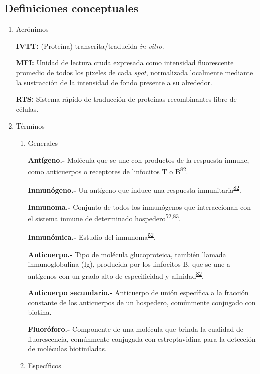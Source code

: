 \documentclass[]{article}
\begin{document}
\subsection{Definiciones conceptuales}\label{definiciones-conceptuales}

\begin{enumerate}
\def\labelenumi{\alph{enumi}.}
\item
  Acrónimos

  \textbf{IVTT:} (Proteína) transcrita/traducida \emph{in vitro}.

  \textbf{MFI:} Unidad de lectura cruda expresada como intensidad
  fluorescente promedio de todos los pixeles de cada \emph{spot},
  normalizada localmente mediante la sustracción de la intensidad de
  fondo presente a su alrededor.

  \textbf{RTS:} Sistema rápido de traducción de proteínas recombinantes
  libre de células.
\item
  Términos

  \begin{enumerate}
  \def\labelenumii{\roman{enumii}.}
  \item
    Generales

    \textbf{Antígeno.-} Molécula que se une con productos de la
    respuesta inmune, como anticuerpos o receptores de linfocitos T o
    B\textsuperscript{\protect\hyperlink{ref-abbas2012}{82}}.

    \textbf{Inmunógeno.-} Un antígeno que induce una respuesta
    inmunitaria\textsuperscript{\protect\hyperlink{ref-abbas2012}{82}}.

    \textbf{Inmunoma.-} Conjunto de todos los inmunógenos que
    interaccionan con el sistema inmune de determinado
    hospedero\textsuperscript{\protect\hyperlink{ref-immunomics2016}{52},\protect\hyperlink{ref-sette2005}{83}}.

    \textbf{Inmunómica.-} Estudio del
    inmunoma\textsuperscript{\protect\hyperlink{ref-immunomics2016}{52}}.

    \textbf{Anticuerpo.-} Tipo de molécula glucoproteica, también
    llamada inmunoglobulina (Ig), producida por los linfocitos B, que se
    une a antígenos con un grado alto de especificidad y
    afinidad\textsuperscript{\protect\hyperlink{ref-abbas2012}{82}}.

    \textbf{Anticuerpo secundario.-} Anticuerpo de unión específica a la
    fracción constante de los anticuerpos de un hospedero, comúnmente
    conjugado con biotina.

    \textbf{Fluoróforo.-} Componente de una molécula que brinda la
    cualidad de fluorescencia, comúnmente conjugada con estreptavidina
    para la detección de moléculas biotiniladas.
  \item
    Específicos


\end{enumerate}
\end{enumerate}
\end{document}
